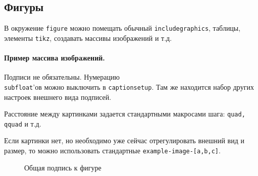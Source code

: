 \subsection{Фигуры}
В окружение \texttt{figure} можно помещать обычный \texttt{includegraphics}, таблицы, элементы \texttt{tikz}, создавать массивы изображений и т.д. 

\paragraph{Пример массива изображений.}
Подписи не обязательны. Нумерацию \\ \texttt{subfloat}'ов можно выключить в \texttt{captionsetup}. Там же находится набор других настроек внешнего вида подписей.

Расстояние между картинками задается стандартными макросами шага: \texttt{quad, qquad} и т.д.

Если картинки нет, но необходимо уже сейчас отрегулировать внешний вид и размер, то можно использовать стандартные \texttt{example-image-[a,b,c]}.

\begin{figure}[H]
	\centering
	\captionsetup[subfigure]{justification=centering}
	\quad
	\quad
	\quad
	\caption{Общая подпись к фигуре}
\end{figure}

